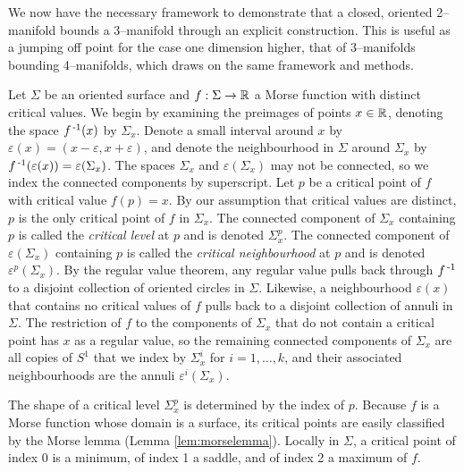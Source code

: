 \label{sec:2bound3}

We now have the necessary framework to demonstrate that a closed, oriented 2--manifold bounds a 3--manifold through an explicit construction.
This is useful as a jumping off point for the case one dimension higher, that of 3--manifolds bounding 4--manifolds, which draws on the same framework and methods.

Let $\Sigma$ be an oriented surface and $f:\Sigma\to\mathbb{R}$ a Morse function with distinct critical values.
We begin by examining the preimages of points $x\in\mathbb{R}$, denoting the space $f^{\,\text{-}1}(x)$ by $\Sigma_x$.
Denote a small interval around $x$ by $\varepsilon(x)=(x-\varepsilon,x+\varepsilon)$, and denote the neighbourhood in $\Sigma$ around $\Sigma_x$ by $f^{\,\text{-}1}(\varepsilon(x))=\varepsilon(\Sigma_x)$.
The spaces $\Sigma_x$ and $\varepsilon(\Sigma_x)$ may not be connected, so we index the connected components by superscript.
Let $p$ be a critical point of $f$ with critical value $f(p)=x$.
By our assumption that critical values are distinct, $p$ is the only critical point of $f$ in $\Sigma_x$.
The connected component of $\Sigma_x$ containing $p$ is called the \emph{critical level} at $p$ and is denoted $\Sigma_x^p$.
The connected component of $\varepsilon(\Sigma_x)$ containing $p$ is called the \emph{critical neighbourhood} at $p$ and is denoted $\varepsilon^p(\Sigma_x)$.
By the regular value theorem, any regular value pulls back through $f^{\,\text{-}1}$ to a disjoint collection of oriented circles in $\Sigma$.
Likewise, a neighbourhood $\varepsilon(x)$ that contains no critical values of $f$ pulls back to a disjoint collection of annuli in $\Sigma$.
The restriction of $f$ to the components of $\Sigma_x$ that do not contain a critical point has $x$ as a regular value, so the remaining connected components of $\Sigma_x$ are all copies of $S^1$ that we index by $\Sigma_x^i$ for $i=1,\dots,k$, and their associated neighbourhoods are the annuli $\varepsilon^i(\Sigma_x)$.

The shape of a critical level $\Sigma_x^p$ is determined by the index of $p$.
Because $f$ is a Morse function whose domain is a surface, its critical points are easily classified by the Morse lemma (Lemma \ref{lem:morselemma}).
Locally in $\Sigma$, a critical point of index 0 is a minimum, of index 1 a saddle, and of index 2 a maximum of $f$.

